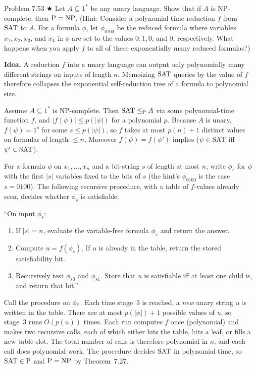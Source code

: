 \begin{question}{Problem 7.53 $\bigstar$}
Let $A\subseteq 1^*$ be any unary language. Show that if $A$ is NP-complete, then $\mathrm{P}=\mathrm{NP}$. (Hint: Consider a polynomial time reduction $f$ from $\mathrm{SAT}$ to $A$. For a formula $\phi$, let $\phi_{0100}$ be the reduced formula where variables $x_1,x_2,x_3$, and $x_4$ in $\phi$ are set to the values $0,1,0$, and $0$, respectively. What happens when you apply $f$ to all of these exponentially many reduced formulas?)
\end{question}
\begin{soln}
\textbf{Idea.} A reduction $f$ into a unary language can output only polynomially many different strings on inputs of length $n$. Memoizing $\mathrm{SAT}$ queries by the value of $f$ therefore collapses the exponential self-reduction tree of a formula to polynomial size.

Assume $A\subseteq 1^*$ is NP-complete. Then $\mathrm{SAT}\le_{\mathrm{P}} A$ via some polynomial-time function $f$, and $\lvert f(\psi)\rvert\le p(\lvert\psi\rvert)$ for a polynomial $p$. Because $A$ is unary, $f(\psi)=1^{s}$ for some $s\le p(\lvert\psi\rvert)$, so $f$ takes at most $p(n)+1$ distinct values on formulas of length $\le n$. Moreover $f(\psi)=f(\psi')$ implies ($\psi\in\mathrm{SAT}$ iff $\psi'\in\mathrm{SAT}$).

For a formula $\phi$ on $x_1,\ldots,x_n$ and a bit-string $s$ of length at most $n$, write $\phi_s$ for $\phi$ with the first $\lvert s\rvert$ variables fixed to the bits of $s$ (the hint's $\phi_{0100}$ is the case $s=0100$). The following recursive procedure, with a table of $f$-values already seen, decides whether $\phi_s$ is satisfiable.

``On input $\phi_s$:
\begin{enumerate}
\item If $\lvert s\rvert=n$, evaluate the variable-free formula $\phi_s$ and return the answer.
\item Compute $u=f(\phi_s)$. If $u$ is already in the table, return the stored satisfiability bit.
\item Recursively test $\phi_{s0}$ and $\phi_{s1}$. Store that $u$ is satisfiable iff at least one child is, and return that bit.''
\end{enumerate}

Call the procedure on $\phi_\varepsilon$. Each time stage~3 is reached, a \emph{new} unary string $u$ is written in the table. There are at most $p(\lvert\phi\rvert)+1$ possible values of $u$, so stage~3 runs $O(p(n))$ times. Each run computes $f$ once (polynomial) and makes two recursive calls, each of which either hits the table, hits a leaf, or fills a new table slot. The total number of calls is therefore polynomial in $n$, and each call does polynomial work. The procedure decides $\mathrm{SAT}$ in polynomial time, so $\mathrm{SAT}\in\mathrm{P}$ and $\mathrm{P}=\mathrm{NP}$ by Theorem~7.27.
\end{soln}

